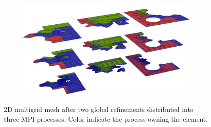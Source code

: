 \documentclass[preprint,12pt,times]{elsarticle}
\begin{document}
\begin{figure}[!ht]
  \centering
  \begin{subfigure}[b]{0.8\textwidth}
    \centering
    \includegraphics[width=\textwidth]{gmg_2d.png}
  \end{subfigure}
  \caption{2D multigrid mesh after two global refinements distributed into three MPI processes. Color indicate the process owning the element.}%
  \label{fig:miehe_gmg}
\end{figure}
\end{document}
